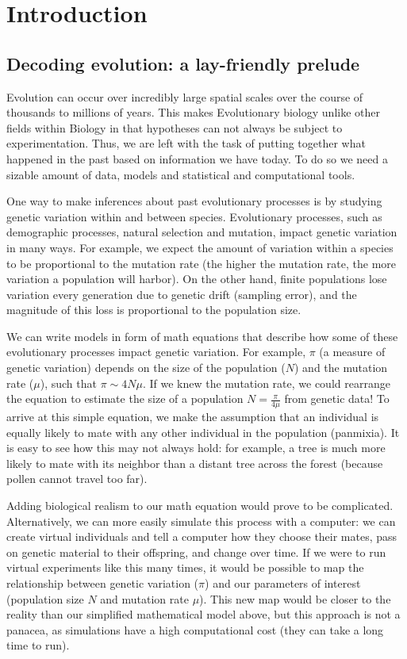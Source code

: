 \chapter{Introduction}

\section{Decoding evolution: a lay-friendly prelude}

Evolution can occur over incredibly large spatial scales over the course of thousands to millions of years.
This makes Evolutionary biology unlike other fields within Biology in that hypotheses can not always be subject to experimentation.
Thus, we are left with the task of putting together what happened in the past based on information we have today.
To do so we need a sizable amount of data, models and statistical and computational tools.

One way to make inferences about past evolutionary processes is by studying genetic variation within and between species.
Evolutionary processes, such as demographic processes, natural selection and mutation, impact genetic variation in many ways.
For example, we expect the amount of variation within a species to be proportional to the mutation rate (\ie the higher the mutation rate, the more variation a population will harbor).
On the other hand, finite populations lose variation every generation due to genetic drift (\ie sampling error), 
and the magnitude of this loss is proportional to the population size.

We can write models in form of math equations that describe how some of these evolutionary processes impact genetic variation.
For example, $\pi$ (a measure of genetic variation) depends on the size of the population ($N$) and the mutation rate ($\mu$), such that $\pi \sim 4N\mu$.
If we knew the mutation rate, we could rearrange the equation to estimate the size of a population $N = \frac{\pi}{4\mu}$ from genetic data!
To arrive at this simple equation, we make the assumption that an individual is equally likely to mate with any other individual in the population (\ie panmixia).
It is easy to see how this may not always hold:
for example, a tree is much more likely to mate with its neighbor than a distant tree across the forest (because pollen cannot travel too far).

Adding biological realism to our math equation would prove to be complicated.
Alternatively, we can more easily simulate this process with a computer:
we can create virtual individuals and tell a computer how they choose their mates, pass on genetic material to their offspring, and change over time.
If we were to run virtual experiments like this many times,
it would be possible to map the relationship between genetic variation ($\pi$) and our parameters of interest (population size $N$ and mutation rate $\mu$).
This new map would be closer to the reality than our simplified mathematical model above,
but this approach is not a panacea, as simulations have a high computational cost (\ie they can take a long time to run).

